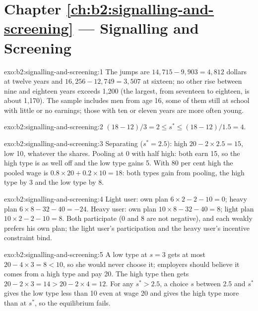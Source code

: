 \section*{Chapter \ref{ch:b2:signalling-and-screening} --- Signalling and Screening}

\begin{solution}{exo:b2:signalling-and-screening:1}
The jumps are $14{,}715 - 9{,}903 = 4{,}812$ dollars at twelve years and $16{,}256 - 12{,}749 = 3{,}507$ at sixteen; no other rise between nine
and eighteen years exceeds 1{,}200 (the largest, from seventeen to eighteen, is about 1{,}170). The sample includes men from age
16, some of them still at school with little or no earnings; those with ten or eleven years are more often young.
\end{solution}

\begin{solution}{exo:b2:signalling-and-screening:2}
$(18 - 12)/3 = 2 \le s^* \le (18 - 12)/1.5 = 4$.
\end{solution}

\begin{solution}{exo:b2:signalling-and-screening:3}
Separating ($s^* = 2.5$): high $20 - 2 \times 2.5 = 15$, low 10, whatever the shares. Pooling at 0 with half high: both earn 15, so the high
type is as well off and the low type gains 5. With 80 per cent high the pooled wage is $0.8 \times 20 + 0.2 \times 10 = 18$: both types gain
from pooling, the high type by 3 and the low type by 8.
\end{solution}

\begin{solution}{exo:b2:signalling-and-screening:4}
Light user: own plan $6 \times 2 - 2 - 10 = 0$; heavy plan $6 \times 8 - 32 - 40 = -24$. Heavy user: own plan $10 \times 8 - 32 - 40 = 8$; light plan
$10 \times 2 - 2 - 10 = 8$. Both participate (0 and 8 are not negative), and each weakly prefers his own plan; the light user's
participation and the heavy user's incentive constraint bind.
\end{solution}

\begin{solution}{exo:b2:signalling-and-screening:5}
A low type at $s = 3$ gets at most $20 - 4 \times 3 = 8 < 10$, so she would never choose it; employers should believe it comes from a high
type and pay 20. The high type then gets $20 - 2 \times 3 = 14 > 20 - 2 \times 4 = 12$. For any $s^* > 2.5$, a choice $s$ between 2.5 and $s^*$ gives
the low type less than 10 even at wage 20 and gives the high type more than at $s^*$, so the equilibrium fails.
\end{solution}

